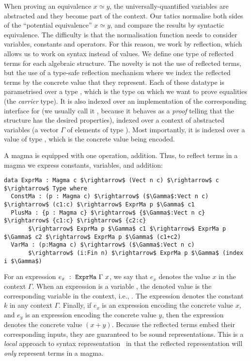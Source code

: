 When proving an equivalence $x \simeq y$, the universally-quantified
variables are abstracted and they become part of the context. Our
tatics normalise both sides of the ``potential equivalence'' $x
\simeq y$, and compare the results by syntactic equivalence. The
difficulty is that the normalisation function needs to consider
variables, constants and operators. For this
reason, we work by reflection, which allows us to work on syntax instead of values. We define one type of reflected
terms for each algebraic structure. The novelty is not the use of reflected
terms, but the use of a type-safe reflection
mechanism where we index the reflected terms by the concrete value that they
represent. Each of these datatype is parametrised over a type , which
is the type on which we want to prove equalities (the \emph{carrier}
type). It is also indexed over an implementation of the corresponding interface
for  (we usually call it , because it behaves as a \emph{proof}
telling that the structure  has the desired properties), indexed over a
context of abstracted variables (a vector $\Gamma$ of  elements of type
). Most importantly, it is indexed over a value of type ,
which is the concrete value being encoded.

A magma is equipped with one operation, addition. Thus, to reflect terms in a
magma we express constants, variables, and addition:

\begin{lstlisting}
data ExprMa : Magma c $\rightarrow$ (Vect n c) $\rightarrow$ c $\rightarrow$ Type where
  ConstMa : (p : Magma c) $\rightarrow$ ($\Gamma$:Vect n c) $\rightarrow$ (c1:c) $\rightarrow$ ExprMa p $\Gamma$ c1 
  PlusMa : {p : Magma c} $\rightarrow$ {$\Gamma$:Vect n c} $\rightarrow$ {c1:c} $\rightarrow$ {c2:c} 
       $\rightarrow$ ExprMa p $\Gamma$ c1 $\rightarrow$ ExprMa p $\Gamma$ c2 $\rightarrow$ ExprMa p $\Gamma$ (c1+c2) 
  VarMa : (p:Magma c) $\rightarrow$ ($\Gamma$:Vect n c)
       $\rightarrow$ (i:Fin n) $\rightarrow$ ExprMa p $\Gamma$ (index i $\Gamma$)
\end{lstlisting}

For an expression $e_x\ :\ \code{ExprMa}\ \Gamma\ x$, we say that $e_x$
denotes the value $x$ in the context $\Gamma$.  When an expression
is a variable , the denoted value is the
corresponding variable in the context, i.e., .  The
expression  denotes the constant $k$ in any context $\Gamma$. Finally, if $e_x$ is an expression encoding the concrete value $x$, and
$e_y$ is an expression encoding the concrete value $y$, then the expression
 denotes the concrete value $(x + y)$. Because the
reflected terms embed their corresponding inputs, they are guaranteed to be
sound representations.
This is a \emph{local} approach to syntax representation~\cite{Farmer13}
in that the reflected representation will \emph{only} represent terms in
a magma.

